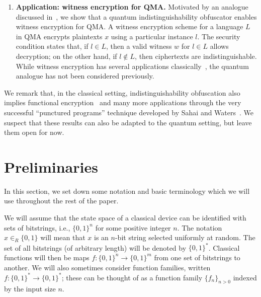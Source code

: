 \documentclass[11pt]{article}
\numberwithin{equation}{section}
\newcommand{\inrand}{\in_R}
\begin{document}
{\begin{enumerate}
\item \textbf{Application: witness encryption for QMA.} Motivated by an analogue discussed in~\cite{GGSW13, GGHRSW13}, we show that a quantum indistinguishability obfuscator enables witness encryption for QMA. A witness encryption scheme for a language $L$ in QMA encrypts plaintexts $x$ using a particular instance $l$. The security condition states that, if $l \in L$, then a valid witness $w$ for $l \in L$ allows decryption; on the other hand, if $l \notin L$, then ciphertexts are indistinguishable. While witness encryption has several applications classically~\cite{GGSW13}, the quantum analogue has not been considered previously.
\end{enumerate}

We remark that, in the classical setting, indistinguishability obfuscation also implies functional encryption~\cite{GGHRSW13} and many more applications through the very successful ``punctured programs'' technique developed by Sahai and Waters~\cite{SW14}. We suspect that these results can also be adapted to the quantum setting, but leave them open for now.

\section{Preliminaries}

In this section, we set down some notation and basic terminology which we will use throughout the rest of the paper.

We will assume that the state space of a classical device can be identified with sets of bitstrings, i.e., $\{0, 1\}^n$ for some positive integer $n$. The notation $x \inrand \{0, 1\}$ will mean that $x$ is an $n$-bit string selected uniformly at random. The set of all bitstrings (of arbitrary length) will be denoted by $\{0, 1\}^*$. Classical functions will then be maps $f : \{0, 1\}^n \rightarrow \{0, 1\}^m$ from one set of bitstrings to another. We will also sometimes consider function families, written $f : \{0, 1\}^* \rightarrow \{0, 1\}^*$; these can be thought of as a function family $\{f_n\}_{n>0}$ indexed by the input size $n$. 

}
\end{document}
